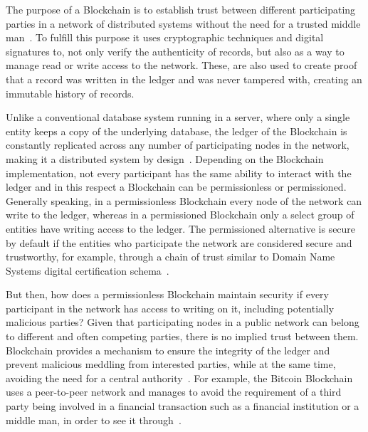 The purpose of a Blockchain is to establish trust between different
participating parties in a network of distributed systems without the need for
a trusted middle man~\cite{Drescher2017}. To fulfill this purpose it uses
cryptographic techniques and digital signatures to, not only verify the
authenticity of records, but also as a way to manage read or write access to
the network. These, are also used to create proof that a record was written in
the ledger and was never tampered with, creating an immutable history of
records.

Unlike a conventional database system running in a server, where only a single
entity keeps a copy of the underlying database, the ledger of the Blockchain is
constantly replicated across any number of participating nodes in the network,
making it a distributed system by design~\cite{Lewis2015}. Depending on the
Blockchain implementation, not every participant has the same ability to
interact with the ledger and in this respect a Blockchain can be permissionless
or permissioned.  Generally speaking, in a permissionless Blockchain every node
of the network can write to the ledger, whereas in a permissioned Blockchain
only a select group of entities have writing access to the ledger. The
permissioned alternative is secure by default if the entities who participate
the network are considered secure and trustworthy, for example, through a chain
of trust similar to Domain Name Systems digital certification
schema~\cite{Lewis2015,Valenta2017}.

But then, how does a permissionless Blockchain maintain security if every
participant in the network has access to writing on it, including potentially
malicious parties? Given that participating nodes in a public network can
belong to different and often competing parties, there is no implied trust
between them. Blockchain provides a mechanism to ensure the integrity of the
ledger and prevent malicious meddling from interested parties, while at the
same time, avoiding the need for a central authority~\cite{Barclay2017}. For
example, the Bitcoin Blockchain uses a peer-to-peer network and manages to
avoid the requirement of a third party being involved in a financial
transaction such as a financial institution or a middle man, in order to see it
through~\cite{Nakamoto2008}.

